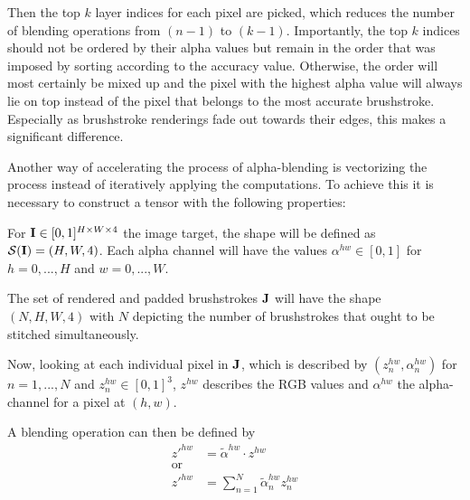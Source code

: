 Then the top $k$ layer indices for each pixel are picked, which reduces the number of blending operations from $(n-1)$ to $(k-1)$.
Importantly, the top $k$ indices should not be ordered by their alpha values but remain in the order that was imposed by sorting according to the accuracy value.
Otherwise, the order will most certainly be mixed up and the pixel with the highest alpha value will always lie on top instead of the pixel that belongs to the most accurate brushstroke.
Especially as brushstroke renderings fade out towards their edges, this makes a significant difference.


Another way of accelerating the process of alpha-blending is vectorizing the process instead of iteratively applying the computations.
To achieve this it is necessary to construct a tensor with the following properties:

For $\mathbf{I} \in [0, 1]^{H \times W \times 4} $ the image target, the shape will be defined
as $\mathcal{S}(\mathbf{I}) = (H, W, 4)$.
Each alpha channel will have the values $\alpha^{hw} \in [0, 1]$ for $h = 0, ..., H$ and $w = 0, ..., W$.

The set of rendered and padded brushstrokes $\mathbf{J}$ will have the shape $(N, H, W, 4)$ with $N$ depicting the number of brushstrokes that ought to be stitched simultaneously.

Now, looking at each individual pixel in $\mathbf{J}$, which is described by $(z^{hw}_n, \alpha^{hw}_n)$ for $n = 1, ..., N$ and $z^{hw}_n \in [0, 1]^{3}$, $z^{hw}$ describes the RGB values and $\alpha^{hw}$ the alpha-channel for a pixel at $(h, w)$.

A blending operation can then be defined by
\begin{align}
    z'^{hw} & = \tilde{\alpha}^{hw} \cdot z^{hw} \\
    \text{or} \\
    z'^{hw} & = \sum_{n=1}^N \tilde{\alpha}^{hw}_n  z^{hw}_n \\
\end{align}

